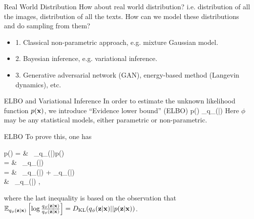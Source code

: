 \documentclass{beamer}
\begin{document}
\begin{frame}{Real World Distribution}
	How about real world distribution? i.e. distribution of all the images, distribution of all the texts. How can we model these distributions and do sampling from them?
	\begin{itemize}
		\item 1. Classical non-parametric approach, e.g. mixture Gaussian model.
		\item 2. Bayesian inference, e.g. variational inference.
		\item 3. Generative adversarial network (GAN), energy-based method (Langevin dynamics), etc.
	\end{itemize}
\end{frame}


\begin{frame}{ELBO and Variational Inference}
	In order to estimate the unknown likelihood function $p(\mathbf{x})$, we introduce ``Evidence lower bound'' (ELBO)
	\bequn
		\log p(\mfx) \geq \mbE_{q_{\phi}(\mfz|\mfx)}\lb \log {} \rb
	\eequn
	Here $\phi$ may be any statistical models, either parametric or non-parametric. 
\end{frame}


\begin{frame}{ELBO}
	To prove this, one has
	\bequn
		\begin{aligned}
		\log p(\mfx)  = & \ \mbE_{q_{\phi}(\mfz|\mfx)}\lb \log p(\mfx) \rb  			\\
		= & \ \mbE_{q_{\phi}(\mfz|\mfx)}\lb \log {} \rb  			\\
		= & \ \mbE_{q_{\phi}(\mfz|\mfx)}\lb \log {} \rb + \mbE_{q_{\phi}(\mfz|\mfx)}\lb \log {} \rb  			\\
		\geq & \ \mbE_{q_{\phi}(\mfz|\mfx)}\lb \log {} \rb, 			\\
		\end{aligned}
	\eequn
	where the last inequality is based on the observation that $\mathbb{E}_{q_{\phi}(\mathbf{z}|\mathbf{x})}\left[ \log \frac{q_{\phi}(\mathbf{z}|\mathbf{x})}{q_{\phi}(\mathbf{z}|\mathbf{x})} \right] = D_{\operatorname{KL}}(q_{\phi}(\mathbf{z}|\mathbf{x})||p(\mathbf{z}|\mathbf{x}))$.
\end{frame}
\end{document}
